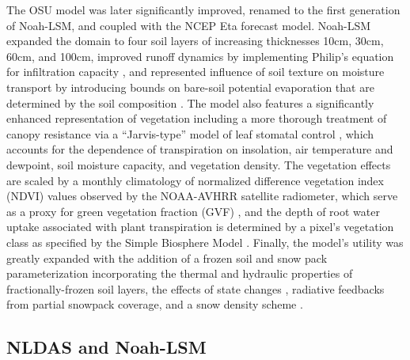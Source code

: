 \documentclass[11pt]{article}
\begin{document}
\begin{multicols}{2}

    The OSU model was later significantly improved, renamed to the first generation of Noah-LSM, and coupled with the NCEP Eta forecast model. Noah-LSM expanded the domain to four soil layers of increasing thicknesses 10cm, 30cm, 60cm, and 100cm, improved runoff dynamics by implementing Philip's equation for infiltration capacity \cite{schaake_simple_1996}, and represented influence of soil texture on moisture transport by introducing bounds on bare-soil potential evaporation that are determined by the soil composition \cite{betts_assessment_1997}\cite{mahfouf_comparative_1991}. The model also features a significantly enhanced representation of vegetation including a more thorough treatment of canopy resistance via a ``Jarvis-type'' model of leaf stomatal control \cite{jarvis_interpretation_1976}\cite{jacquemin_sensitivity_1990}, which accounts for the dependence of transpiration on insolation, air temperature and dewpoint, soil moisture capacity, and vegetation density. The vegetation effects are scaled by a monthly climatology of normalized difference vegetation index (NDVI) values observed by the NOAA-AVHRR satellite radiometer, which serve as a proxy for green vegetation fraction (GVF) \cite{gutman_derivation_1998}\cite{chen_modeling_1996}, and the depth of root water uptake associated with plant transpiration is determined by a pixel's vegetation class as specified by the Simple Biosphere Model \cite{dorman_global_1989}. Finally, the model's utility was greatly expanded with the addition of a frozen soil and snow pack parameterization incorporating the thermal and hydraulic properties of fractionally-frozen soil layers, the effects of state changes \cite{chen_modeling_1996}\cite{koren_parameterization_1999}, radiative feedbacks from partial snowpack coverage, and a snow density scheme \cite{ek_implementation_2003}.

    \subsection{NLDAS and Noah-LSM}


\end{multicols}
\end{document}
